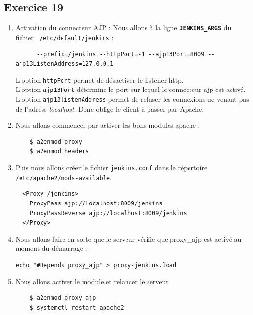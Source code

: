\documentclass{report}
\begin{document}
\subsection{Exercice 19}
\begin{enumerate}
  \item Activation du connecteur AJP :
  Nous allons à la ligne \texttt{\textbf{JENKINS\_ARGS}} du fichier \texttt{
  /etc/default/jenkins} :
  \begin{tcolorbox}
    \begin{verbatim}
      --prefix=/jenkins --httpPort=-1 --ajp13Port=8009 --ajp13ListenAddress=127.0.0.1
    \end{verbatim}
  \end{tcolorbox}
  L'option \texttt{httpPort} permet de désactiver le listener http.\\
  L'option \texttt{ajp13Port} détermine le port sur lequel le connecteur ajp est activé.
  L'option \texttt{ajp13listenAddress} permet de refuser les connexions ne venant
  pas de l'adress \textit{localhost}. Donc oblige le client à passer par Apache.

\item Nous allons commencer par activer les bons modules apache :

\begin{tcolorbox}
  \begin{verbatim}
    $ a2enmod proxy
    $ a2enmod headers
  \end{verbatim}
\end{tcolorbox}
\item
Puis nous allons créer le fichier \texttt{jenkins.conf} dans le répertoire
\texttt{/etc/apache2/mods-available}.
\begin{tcolorbox}
  \begin{verbatim}
  <Proxy /jenkins>
    ProxyPass ajp://localhost:8009/jenkins
    ProxyPassReverse ajp://localhost:8009/jenkins
  </Proxy>
  \end{verbatim}
\end{tcolorbox}
\item Nous allons faire en sorte que le serveur vérifie que proxy\_ajp est activé
au moment du démarrage :
\begin{tcolorbox}
  \begin{verbatim}
echo "#Depends proxy_ajp" > proxy-jenkins.load
  \end{verbatim}
\end{tcolorbox}
\item Nous allons activer le module et relancer le serveur
\begin{tcolorbox}
  \begin{verbatim}
    $ a2enmod proxy_ajp
    $ systemctl restart apache2
  \end{verbatim}
\end{tcolorbox}
\end{enumerate}
\end{document}
